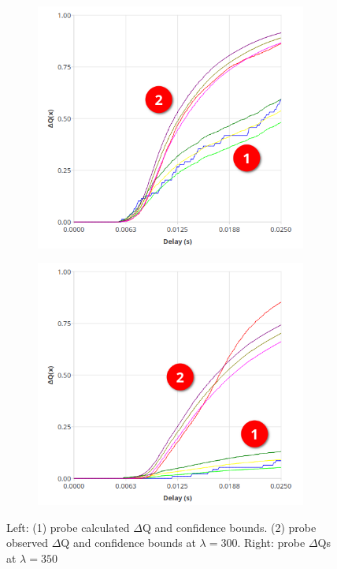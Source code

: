     \begin{figure}[H]
            \centering
            \begin{subfigure}{.5\textwidth}
                \centering
                \includegraphics[width=0.98\textwidth]{img/overload_2/300_probe2.png}
                \label{fig:high_load_1}
            \end{subfigure}%
            \begin{subfigure}{.5\textwidth}
                \centering
                \includegraphics[width =0.98\textwidth]{img/overload_2/350_probe2.png}
                \label{fig:high_load_2}
            \end{subfigure}
            \caption{Left: (1) probe calculated $\Delta$Q and confidence bounds. (2) probe observed $\Delta$Q and confidence bounds at $\lambda = 300$. Right: probe $\Delta$Qs at $\lambda = 350$}
            \label{fig:early_ov}
        \end{figure}

